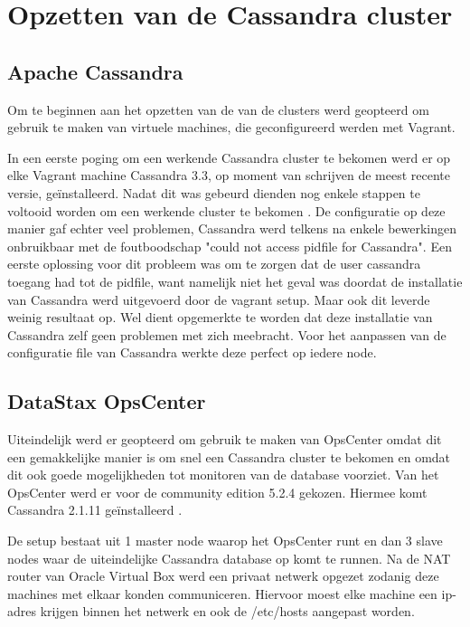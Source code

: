\chapter{Opzetten van de Cassandra cluster}
\label{ch:cassandra_cluster}

\section{Apache Cassandra}
Om te beginnen aan het opzetten van de van de clusters werd geopteerd om gebruik te maken van virtuele machines, die geconfigureerd werden met Vagrant.

In een eerste poging om een werkende Cassandra cluster te bekomen werd er op elke Vagrant machine Cassandra 3.3, op moment van schrijven de meest recente versie, geïnstalleerd.
Nadat dit was gebeurd dienden nog enkele stappen te voltooid worden om een werkende cluster te bekomen \citep{DataStax2016}.
De configuratie op deze manier gaf echter veel problemen, Cassandra werd telkens na enkele bewerkingen onbruikbaar met de foutboodschap "could not access pidfile for Cassandra".
Een eerste oplossing voor dit probleem was om te zorgen dat de user cassandra toegang had tot de pidfile, want namelijk niet het geval was doordat de installatie van Cassandra werd uitgevoerd door de vagrant setup.
Maar ook dit leverde weinig resultaat op.
Wel dient opgemerkte te worden dat deze installatie van Cassandra zelf geen problemen met zich meebracht.
Voor het aanpassen van de configuratie file van Cassandra werkte deze perfect op iedere node.

\section{DataStax OpsCenter}

Uiteindelijk werd er geopteerd om gebruik te maken van OpsCenter omdat dit een gemakkelijke manier is om snel een Cassandra cluster te bekomen en omdat dit ook goede mogelijkheden tot monitoren van de database voorziet.
Van het OpsCenter werd er voor de community edition 5.2.4 gekozen.
Hiermee komt Cassandra 2.1.11 geïnstalleerd \citep{Cantoni2016}.

De setup bestaat uit 1 master node waarop het OpsCenter runt en dan 3 slave nodes waar de uiteindelijke Cassandra database op komt te runnen.
Na de NAT router van Oracle Virtual Box werd een privaat netwerk opgezet zodanig deze machines met elkaar konden communiceren.
Hiervoor moest elke machine een ip-adres krijgen binnen het netwerk en ook de /etc/hosts aangepast worden.

